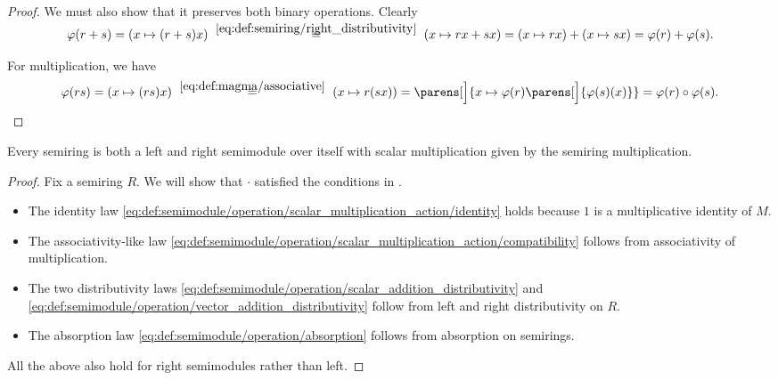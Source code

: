 \begin{proof}
  We must also show that it preserves both binary operations. Clearly
  \begin{equation*}
    \varphi(r + s)
    =
    (x \mapsto (r + s) x)
    \reloset {\eqref{eq:def:semiring/right_distributivity}} =
    (x \mapsto r x + s x)
    =
    (x \mapsto r x) + (x \mapsto s x)
    =
    \varphi(r) + \varphi(s).
  \end{equation*}

  For multiplication, we have
  \begin{equation*}
    \varphi(rs)
    =
    (x \mapsto (rs)x)
    \reloset {\eqref{eq:def:magma/associative}} =
    (x \mapsto r(sx))
    =
    \parens[\Big]{ x \mapsto \varphi(r)\parens[\Big]{ \varphi(s)(x) } }
    =
    \varphi(r) \bincirc \varphi(s).
  \end{equation*}
\end{proof}

\begin{proposition}\label{thm:semiring_is_semimodule}
  Every semiring is both a left and right semimodule over itself with scalar multiplication given by the semiring multiplication.
\end{proposition}
\begin{proof}
  Fix a semiring \( R \). We will show that \( \cdot \) satisfied the conditions in .
  \begin{itemize}
    \item The identity law \eqref{eq:def:semimodule/operation/scalar_multiplication_action/identity} holds because \( 1 \) is a multiplicative identity of \( M \).
    \item The associativity-like law \eqref{eq:def:semimodule/operation/scalar_multiplication_action/compatibility} follows from associativity of multiplication.
    \item The two distributivity laws \eqref{eq:def:semimodule/operation/scalar_addition_distributivity} and \eqref{eq:def:semimodule/operation/vector_addition_distributivity} follow from left and right distributivity on \( R \).
    \item The absorption law \eqref{eq:def:semimodule/operation/absorption} follows from absorption on semirings.
  \end{itemize}

  All the above also hold for right semimodules rather than left.
\end{proof}

